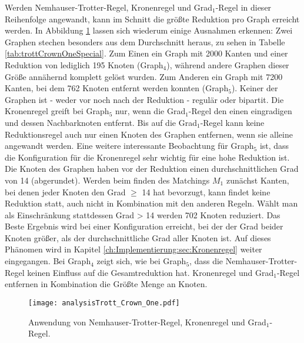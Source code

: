 Werden Nemhauser-Trotter-Regel, Kronenregel und Grad$_{1}$-Regel in dieser Reihenfolge angewandt, kann im Schnitt die größte Reduktion pro Graph erreicht werden. In Abbildung \ref{fig:trottCrownOne} lassen sich wiederum einige Ausnahmen erkennen: Zwei Graphen stechen besonders aus dem Durchschnitt heraus, zu sehen in Tabelle \ref{tab:trottCrownOneSpecial}. Zum Einen ein Graph mit 2000 Kanten und einer Reduktion von lediglich 195 Knoten (Graph$_{4}$), während andere Graphen dieser Größe annähernd komplett gelöst wurden. Zum Anderen ein Graph mit 7200 Kanten, bei dem 762 Knoten entfernt werden konnten (Graph$_{5}$). Keiner der Graphen ist - weder vor noch nach der Reduktion - regulär oder bipartit. Die Kronenregel greift bei Graph$_{5}$ nur, wenn die Grad$_{1}$-Regel den einen eingradigen und dessen Nachbarknoten entfernt. Bis auf die Grad$_{1}$-Regel kann keine Reduktionsregel auch nur einen Knoten des Graphen entfernen, wenn sie alleine angewandt werden. Eine weitere interessante Beobachtung für Graph$_{5}$ ist, dass die Konfiguration für die Kronenregel sehr wichtig für eine hohe Reduktion ist. Die Knoten des Graphen haben vor der Reduktion einen durchschnittlichen Grad von 14 (abgerundet). Werden beim finden des Matchings $M_{1}$ zunächst Kanten, bei denen jeder Knoten den Grad $\geq$ 14 hat bevorzugt, kann findet keine Reduktion statt, auch nicht in Kombination mit den anderen Regeln. Wählt man als Einschränkung stattdessen Grad > 14 werden 702 Knoten reduziert. Das Beste Ergebnis wird bei einer Konfiguration erreicht, bei der der Grad beider Knoten größer, als der durchschnittliche Grad aller Knoten ist. Auf dieses Phänomen wird in Kapitel \ref{ch:Implementierung:sec:Kronenregel} weiter eingegangen. Bei Graph$_{4}$ zeigt sich, wie bei Graph$_{5}$, dass die Nemhauser-Trotter-Regel keinen Einfluss auf die Gesamtreduktion hat. Kronenregel und Grad$_{1}$-Regel entfernen in Kombination die Größte Menge an Knoten.


\begin{figure}[htb]
\centering
  	{\texttt{[image: analysisTrott\_Crown\_One.pdf]}}
	\caption{Anwendung von Nemhauser-Trotter-Regel, Kronenregel und Grad$_{1}$-Regel.\label{fig:trottCrownOne}}
\centering
\end{figure}


